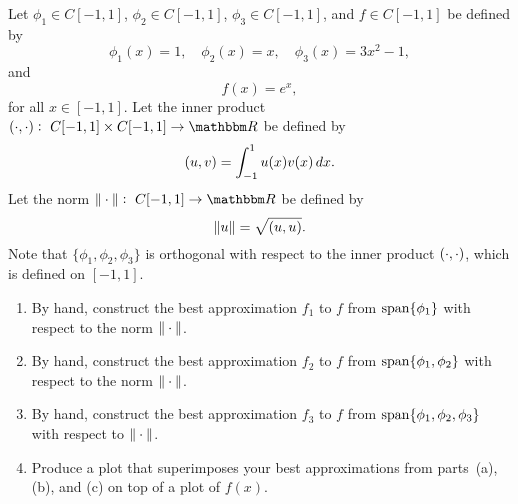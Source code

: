 
Let $\phi_1\in C[-1,1]$, $\phi_2\in C[-1,1]$, $\phi_3\in C[-1,1]$, and $f\in C[-1,1]$ be defined by
\[
\phi_1(x) = 1, \quad \phi_2(x) = x, \quad \phi_3(x) = 3x^2-1,
\]
and
\[
f(x) = e^x,
\]
for all $x\in[-1,1]$. Let the inner product $\ip{\cdot,\cdot}:\mbox{ }C[-1,1]\times C[-1,1]\rightarrow\R$ be defined by
\[
(u,v) = \int_{-1}^1 u(x)v(x)\, dx.
\]
Let the norm $\norm{\cdot}:\mbox{ }C[-1,1]\rightarrow\R$ be defined by
\[
\|u\| = \sqrt{(u,u)}.
\]
Note that $\{\phi_1,\phi_2,\phi_3\}$ is orthogonal with respect to the inner product $(\cdot,\cdot)$, which is defined on $[-1,1]$.
\\
\begin{enumerate}
\item By hand, construct the best approximation $f_1$ to $f$ from ${\rm span}\{\phi_1\}$ with respect to the norm $\|\cdot\|$.
\\
\item By hand, construct the best approximation $f_2$ to $f$ from ${\rm span}\{\phi_1,\phi_2\}$ with respect to the norm $\|\cdot\|$.
\\
\item By hand, construct the best approximation $f_3$ to $f$ from ${\rm span}\{\phi_1,\phi_2,\phi_3\}$ with respect to $\|\cdot\|$.
\\
\item  Produce a plot that superimposes your best approximations from parts~(a), (b), and (c) on top of a plot of $f(x)$.
\end{enumerate}




